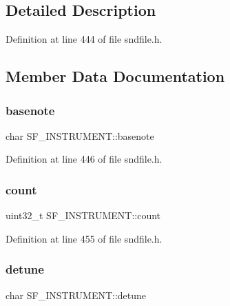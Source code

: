 \subsection{Detailed Description}


Definition at line 444 of file sndfile.\+h.



\subsection{Member Data Documentation}
\mbox{\label{struct_s_f___i_n_s_t_r_u_m_e_n_t_ab131f2d1e1297b20b9b64596bd9fef2c}} 
\subsubsection{\texorpdfstring{basenote}{basenote}}
{\footnotesize\ttfamily char S\+F\+\_\+\+I\+N\+S\+T\+R\+U\+M\+E\+N\+T\+::basenote}



Definition at line 446 of file sndfile.\+h.

\mbox{\label{struct_s_f___i_n_s_t_r_u_m_e_n_t_a5b7a619e1135f3a0cba1d68e8855c968}} 
\subsubsection{\texorpdfstring{count}{count}}
{\footnotesize\ttfamily uint32\+\_\+t S\+F\+\_\+\+I\+N\+S\+T\+R\+U\+M\+E\+N\+T\+::count}



Definition at line 455 of file sndfile.\+h.

\mbox{\label{struct_s_f___i_n_s_t_r_u_m_e_n_t_a15c6ebfa70d434dae34742c58a8ef9bf}} 
\subsubsection{\texorpdfstring{detune}{detune}}
{\footnotesize\ttfamily char S\+F\+\_\+\+I\+N\+S\+T\+R\+U\+M\+E\+N\+T\+::detune}



